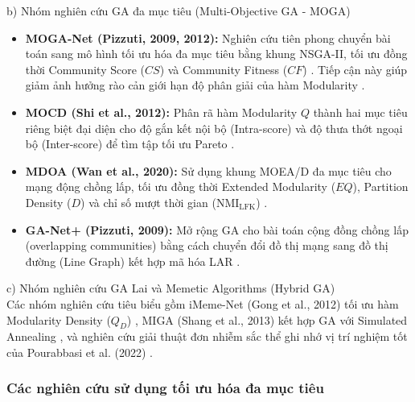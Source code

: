 \documentclass[14pt,a4paper]{extarticle}
\begin{document}
\noindent b) Nhóm nghiên cứu GA đa mục tiêu (Multi-Objective GA - MOGA)
\begin{itemize}
    \item \textbf{MOGA-Net (Pizzuti, 2009, 2012):} Nghiên cứu tiên phong chuyển bài toán sang mô hình tối ưu hóa đa mục tiêu bằng khung NSGA-II, tối ưu đồng thời Community Score ($CS$) và Community Fitness ($CF$) \cite{Bedi2016}. Tiếp cận này giúp giảm ảnh hưởng rào cản giới hạn độ phân giải của hàm Modularity \cite{Baraa2021}.
    \item \textbf{MOCD (Shi et al., 2012):} Phân rã hàm Modularity $Q$ thành hai mục tiêu riêng biệt đại diện cho độ gắn kết nội bộ (Intra-score) và độ thưa thớt ngoại bộ (Inter-score) để tìm tập tối ưu Pareto \cite{Baraa2021}.
    \item \textbf{MDOA (Wan et al., 2020):} Sử dụng khung MOEA/D đa mục tiêu cho mạng động chồng lấp, tối ưu đồng thời Extended Modularity ($EQ$), Partition Density ($D$) và chỉ số mượt thời gian ($\text{NMI}_{\text{LFK}}$) \cite{Wan2020}.
    \item \textbf{GA-Net+ (Pizzuti, 2009):} Mở rộng GA cho bài toán cộng đồng chồng lấp (overlapping communities) bằng cách chuyển đổi đồ thị mạng sang đồ thị đường (Line Graph) kết hợp mã hóa LAR \cite{Baraa2021, Bedi2016}.
\end{itemize}

\noindent c) Nhóm nghiên cứu GA Lai và Memetic Algorithms (Hybrid GA)
\\ \indent
Các nhóm nghiên cứu tiêu biểu gồm iMeme-Net (Gong et al., 2012) tối ưu hàm Modularity Density ($Q_D$) \cite{Gong2012Memetic}, MIGA (Shang et al., 2013) kết hợp GA với Simulated Annealing \cite{Chen2019}, và nghiên cứu giải thuật đơn nhiễm sắc thể ghi nhớ vị trí nghiệm tốt của Pourabbasi et al. (2022) \cite{Pourabbasi2022}.

\subsubsection{Các nghiên cứu sử dụng tối ưu hóa đa mục tiêu}
\end{document}
